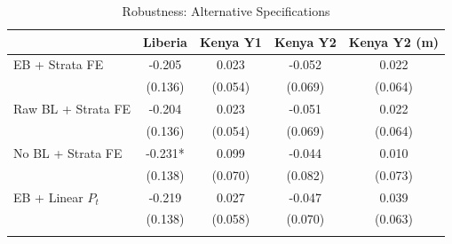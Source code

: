 \begin{table}[htbp]
\centering
\small
\caption{Robustness: Alternative Specifications}
\label{tab:robustness}
\begin{tabular}{l*{4}{c}}
\toprule
 & Liberia & Kenya Y1 & Kenya Y2 & Kenya Y2 (m) \\
\midrule
EB + Strata FE & -0.205 & 0.023 & -0.052 & 0.022 \\
 & (0.136) & (0.054) & (0.069) & (0.064) \\
\addlinespace
Raw BL + Strata FE & -0.204 & 0.023 & -0.051 & 0.022 \\
 & (0.136) & (0.054) & (0.069) & (0.064) \\
\addlinespace
No BL + Strata FE & -0.231* & 0.099 & -0.044 & 0.010 \\
 & (0.138) & (0.070) & (0.082) & (0.073) \\
\addlinespace
EB + Linear $P_t$ & -0.219 & 0.027 & -0.047 & 0.039 \\
 & (0.138) & (0.058) & (0.070) & (0.063) \\
\addlinespace
\bottomrule
\end{tabular}
\end{table}